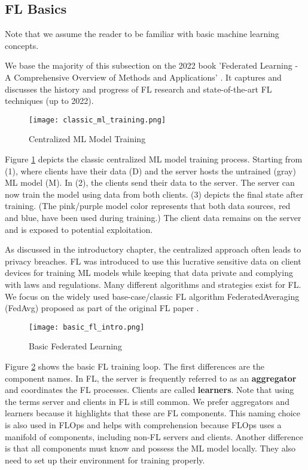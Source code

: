 
\subsection{FL Basics}

Note that we assume the reader to be familiar with basic machine learning concepts.

We base the majority of this subsection on the 2022 book
'Federated Learning - A Comprehensive Overview of Methods and Applications' \cite{book:fl}.
It captures and discusses the history and progress of FL research and state-of-the-art FL techniques (up to 2022).

\begin{figure}[h]
    \centering
    \texttt{[image: classic\_ml\_training.png]}
    \caption{Centralized ML Model Training}
    \label{fig:classic_ml_training}
\end{figure}
Figure \ref{fig:classic_ml_training} depicts the classic centralized ML model training process.
Starting from (1), where clients have their data (D) and
the server hosts the untrained (gray) ML model (M).
In (2), the clients send their data to the server.
The server can now train the model using data from both clients.
(3) depicts the final state after training.
(The pink/purple model color represents that both data sources, red and blue,
have been used during training.)
The client data remains on the server and is exposed to potential exploitation.

As discussed in the introductory chapter, the centralized approach often leads to
privacy breaches. FL was introduced to use this lucrative sensitive data
on client devices for training ML models while keeping that data private and 
complying with laws and regulations.
Many different algorithms and strategies exist for FL.
We focus on the widely used base-case/classic FL algorithm FederatedAveraging (FedAvg)
proposed as part of the original FL paper \cite{paper:original_fl}.

\begin{figure}%
    \centering
    \texttt{[image: basic\_fl\_intro.png]}
    \caption{Basic Federated Learning}
    \label{fig:basic_fl_intro}
\end{figure}
Figure \ref{fig:basic_fl_intro} shows the basic FL training loop.
The first differences are the component names.
In FL, the server is frequently referred to as an \textbf{aggregator}
and coordinates the FL processes.
Clients are called \textbf{learners}.
Note that using the terms server and clients in FL is still common.
We prefer aggregators and learners because it highlights that these are FL components.
This naming choice is also used in FLOps and helps with comprehension
because FLOps uses a manifold of components, including non-FL servers and clients.
Another difference is that all components must know and possess the ML model locally.
They also need to set up their environment for training properly.

